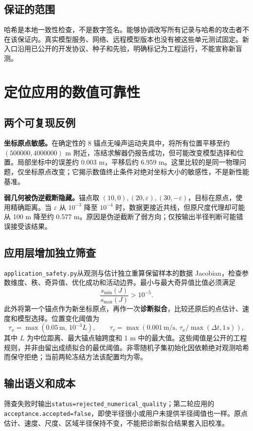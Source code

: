 \documentclass[UTF8,a4paper,zihao=-4,fontset=none]{ctexart}
\newcommand{\code}[1]{{\small\nolinkurl{#1}}}
\begin{document}
\subsection{保证的范围}
哈希是本地一致性检查，不是数字签名。能够协调改写所有记录与哈希的攻击者不在该保证内。真实模型服务、网络、远程模型版本也没有被这些单元测试固定。新入口沿用已公开的开发协议、种子和先验，明确标记为工程运行，不能宣称新盲测。

\newpage
\section{定位应用的数值可靠性}
\subsection{两个可复现反例}
\textbf{坐标原点敏感。}在确定性的 8 锚点无噪声运动夹具中，将所有位置平移至约 $(500000,4000000)$ m 附近，冻结求解器仍报告成功，但可能改变模型选择和位置。局部坐标中的误差约 0.003 m，平移后约 6.959 m。这里比较的是同一物理问题，仅坐标原点改变；它揭示数值终止条件对绝对坐标大小的敏感性，不是新性能基准。

\textbf{弱几何被伪逆截断隐藏。}锚点取 $(10,0),(20,\varepsilon),(30,-\varepsilon)$，目标在原点，使用精确距离。当 $\varepsilon$ 从 $10^{-3}$ 降至 $10^{-4}$ 时，数据更接近共线，但原尺度代理却可能从 100 m 降至约 0.577 m。原因是伪逆截断了弱方向；仅按输出半径判断可能错误接受该结果。

\subsection{应用层增加独立筛查}
\code{application_safety.py}从观测与估计独立重算保留样本的数据 Jacobian，检查参数维度、秩、奇异值、优化成功和活动边界。最小与最大奇异值比值必须满足
\[
\frac{s_{\min}(J)}{s_{\max}(J)}>10^{-5}.
\]
此外将第一个锚点作为新坐标原点，再作一次\textbf{诊断拟合}，比较还原后的点估计、速度和模型选择。位置变化阈值为
\[
\tau_x=\max(0.05\,\mathrm{m},\,10^{-3}L),\qquad
\tau_v=\max(0.001\,\mathrm{m/s},\,\tau_x/\max(\Delta t,1\,\mathrm{s})),
\]
其中 $L$ 为中位距离、最大锚点轴跨度和 1 m 中的最大值。这些阈值是公开的工程规则，并非由留出成绩拟合的最优阈值。非零随机子集初始化因依赖绝对观测哈希而保守拒绝；当前两轮冻结方法该配置均为零。

\subsection{输出语义和成本}
筛查失败时输出\code{status=rejected_numerical_quality}；第二轮应用的\code{acceptance.accepted=false}，即使半径很小或用户未提供半径阈值也一样。原点估计、速度、尺度、区域半径保持不变，不能把诊断拟合结果套入旧校准。
\end{document}
